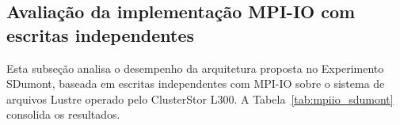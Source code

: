 \begin{table}[H]
\centering
\caption{Desempenho do Experimento SDumont com a implementação atual. O
tempo total corresponde ao tempo de execução medido, que inclui computação,
E/S e comunicação. Este trabalho calcula a eficiência em relação à base de 2~nós.}
\label{tab:central_sdumont}
\small
\setlength{\tabcolsep}{4pt}
\renewcommand{\arraystretch}{1.25}
\end{table}

\subsection{Avaliação da implementação MPI-IO com escritas independentes}
\label{sec:sdumont_mpiio}
Esta subseção analisa o desempenho da arquitetura proposta no
Experimento SDumont, baseada em escritas independentes com MPI-IO sobre o
sistema de arquivos Lustre operado pelo ClusterStor L300. A
Tabela~\ref{tab:mpiio_sdumont} consolida os resultados.

